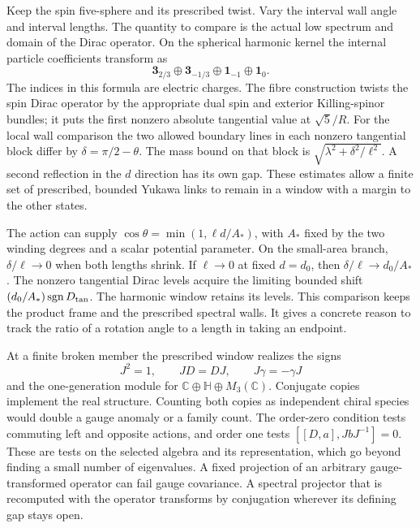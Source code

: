 \documentclass[10pt]{article}
\theoremstyle{definition}
\begin{document}
Keep the spin five-sphere and its prescribed twist. Vary the interval wall angle and interval lengths. The quantity to compare is the actual low spectrum and domain of the Dirac operator. On the spherical harmonic kernel the internal particle coefficients transform as
\begin{equation}
 \mathbf3_{2/3}\oplus\mathbf3_{-1/3}\oplus
 \mathbf1_{-1}\oplus\mathbf1_{0}.
\end{equation}
The indices in this formula are electric charges. The fibre construction twists the spin Dirac operator by the appropriate dual spin and exterior Killing-spinor bundles; it puts the first nonzero absolute tangential value at \(\sqrt5/R\). For the local wall comparison the two allowed boundary lines in each nonzero tangential block differ by \(\delta=\pi/2-\theta\). The mass bound on that block is \(\sqrt{\lambda^2+\delta^2/\ell^2}\). A second reflection in the \(d\) direction has its own gap. These estimates allow a finite set of prescribed, bounded Yukawa links to remain in a window with a margin to the other states.

The action can supply \(\cos\theta=\min(1,\ell d/A_*)\), with \(A_*\) fixed by the two winding degrees and a scalar potential parameter. On the small-area branch, \(\delta/\ell\to0\) when both lengths shrink. If \(\ell\to0\) at fixed \(d=d_0\), then \(\delta/\ell\to d_0/A_*\). The nonzero tangential Dirac levels acquire the limiting bounded shift \((d_0/A_*)\operatorname{sgn}D_{\rm tan}\). The harmonic window retains its levels. This comparison keeps the product frame and the prescribed spectral walls. It gives a concrete reason to track the ratio of a rotation angle to a length in taking an endpoint.

At a finite broken member the prescribed window realizes the signs
\begin{equation}
 J^2=1,\qquad JD=DJ,\qquad J\gamma=-\gamma J
 \label{eq:summer-ko}
\end{equation}
and the one-generation module for \(\mathbb C\oplus\mathbb H\oplus M_3(\mathbb C)\). Conjugate copies implement the real structure. Counting both copies as independent chiral species would double a gauge anomaly or a family count. The order-zero condition tests commuting left and opposite actions, and order one tests \([[D,a],JbJ^{-1}]=0\). These are tests on the selected algebra and its representation, which go beyond finding a small number of eigenvalues. A fixed projection of an arbitrary gauge-transformed operator can fail gauge covariance. A spectral projector that is recomputed with the operator transforms by conjugation wherever its defining gap stays open.
\end{document}
